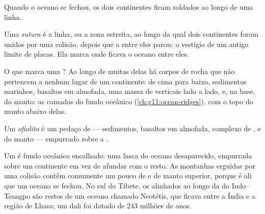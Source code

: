 Quando o oceano se fechou, os dois continentes ficam soldados ao longo de
uma linha.

\begin{definition}[Sutura]\label{def:g12:mountain-building:suture}
Uma \emph{sutura} é a linha, ou a zona estreita, ao longo da
qual dois continentes foram unidos por uma colisão, depois que a 
entre eles parou: o vestígio de um antigo limite de placas. Ela marca onde
ficava o oceano entre eles.
\end{definition}

O que marca uma ? Ao longo de muitas delas há corpos de rocha que não
pertencem a nenhum lugar de um continente: de cima para baixo, sedimentos
marinhos, basaltos em almofada, uma massa de  verticais lado a lado,
 e, na base,  do manto: as camadas do fundo oceânico
(\cref{ch:g11:ocean-ridges}), com o topo do manto abaixo delas.

\begin{definition}[Ofiolito]\label{def:g12:mountain-building:ophiolite}
Um \emph{ofiolito} é um pedaço de  ---
sedimentos, basaltos em almofada, complexo de ,  e  do
manto --- empurrado sobre a .
\end{definition}

Um  é fundo oceânico encalhado: uma lasca do oceano desaparecido,
empurrada sobre um continente em vez de afundar com o resto. As montanhas
erguidas por uma colisão contêm comumente um pouco de  e de
manto superior, porque é ali que um oceano se fechou. No sul do Tibete, os
 alinhados ao longo da  do Indo--Tsangpo são restos de um
oceano chamado Neotétis, que ficava entre a Índia e a região de Lhasa; um
 dali foi datado de 243 milhões de anos.

